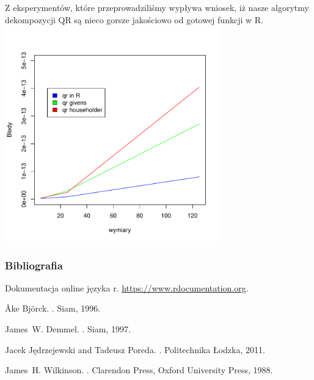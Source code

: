 \documentclass[notheorems]{beamer}
\begin{document}
\begin{frame}[fragile]
{\scriptsize
Z eksperymentów, które przeprowadziliśmy wypływa wniosek, iż nasze algorytmy dekompozycji QR są nieco gorsze jakościowo od gotowej funkcji w R. 
}
\includegraphics[width=0.7\textwidth]{licencjat-027}
\end{frame}

\begin{frame}
\frametitle{Bibliografia}
\begin{thebibliography}{1}

Dokumentacja online języka r.
\newblock \url{https://www.rdocumentation.org}.


Åke Björck.
.
\newblock Siam, 1996.

James~W. Demmel.
.
\newblock Siam, 1997.

Jacek Jędrzejewski and Tadeusz Poreda.
.
\newblock Politechnika Łodzka, 2011.

James~H. Wilkinson.
.
\newblock Clarendon Press, Oxford University Press, 1988.

\end{thebibliography}
\end{frame}





\end{document}
